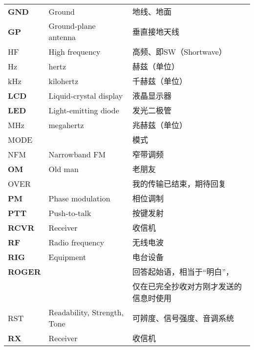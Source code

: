 \begin{longtable}[l]{lll}
	\textbf{GND}   & Ground                               & 地线、地面               \\
	\textbf{GP}    & Ground-plane antenna                 & 垂直接地天线              \\
	HF             & High frequency                       & 高频、即SW（Shortwave）   \\
	Hz             & hertz                                & 赫兹（单位）              \\
	\unit{\kHz}    & kilohertz                            & 千赫兹（单位）             \\
	\textbf{LCD}   & Liquid-crystal display               & 液晶显示器               \\
	\textbf{LED}   & Light-emitting diode                 & 发光二极管               \\
	\unit{\MHz}    & megahertz                            & 兆赫兹（单位）             \\
	MODE           &                                      & 模式                  \\
	NFM            & Narrowband FM                        & 窄带调频                \\
	\textbf{OM}    & Old man                              & 老朋友                 \\%
	OVER           &                                      & 我的传输已结束，期待回复        \\
	\textbf{PM}    & Phase modulation                     & 相位调制                \\
	\textbf{PTT}   & Push-to-talk                         & 按键发射                \\
	\textbf{RCVR}  & Receiver                             & 收信机                 \\
	\textbf{RF}    & Radio frequency                      & 无线电波                \\
	\textbf{RIG}   & Equipment                            & 电台设备                \\
	\textbf{ROGER} &                                      & 回答起始语，相当于“明白”，      \\
	               &                                      & 仅在已完全抄收对方刚才发送的信息时使用 \\
	RST            & Readability, Strength, Tone          & 可辨度、信号强度、音调系统       \\
	\textbf{RX}    & Receiver                             & 收信机                 \\

\end{longtable}
